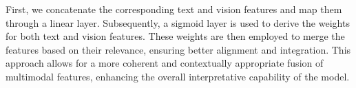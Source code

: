 First, we concatenate the corresponding text and vision features and map them through a linear layer. Subsequently, a sigmoid layer is used to derive the weights for both text and vision features. These weights are then employed to merge the features based on their relevance, ensuring better alignment and integration. This approach allows for a more coherent and contextually appropriate fusion of multimodal features, enhancing the overall interpretative capability of the model.

